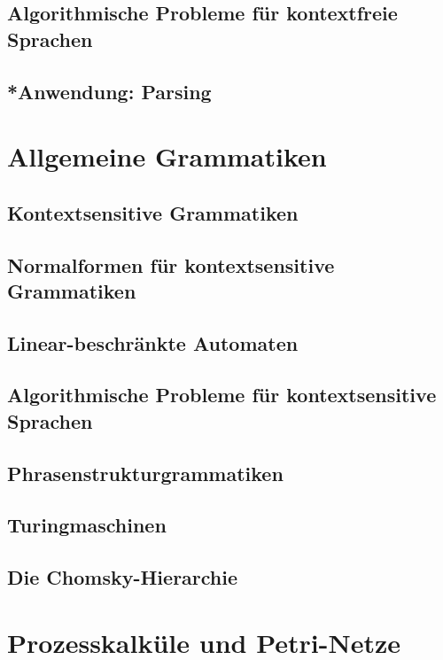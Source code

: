 \documentclass[11pt, a4paper]{article}
\theoremstyle{definition}
\theoremstyle{plain}
\numberwithin{equation}{section}
\begin{document}
\subsection{Algorithmische Probleme für kontextfreie Sprachen}


\subsection{*Anwendung: Parsing}



\newpage
\section{Allgemeine Grammatiken}\label{sec:contextsensitive}
\subsection{Kontextsensitive Grammatiken}


\subsection{Normalformen für kontextsensitive Grammatiken}


\subsection{Linear-beschränkte Automaten}


\subsection{Algorithmische Probleme für kontextsensitive Sprachen}


\subsection{Phrasenstrukturgrammatiken}


\subsection{Turingmaschinen}


\subsection{Die Chomsky-Hierarchie}



\newpage
\section{Prozesskalküle und Petri-Netze}\label{sec:process}
\end{document}

